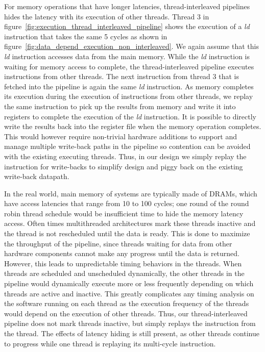 For memory operations that have longer latencies, thread-interleaved pipelines hides the latency with its execution of other threads. 
Thread 3 in figure~\ref{fig:execution_thread_interleaved_pipeline} shows the execution of a \emph{ld} instruction that takes the same 5 cycles as shown in figure~\ref{fig:data_depend_execution_non_interleaved}.
We again assume that this \emph{ld} instruction accesses data from the main memory. 
While the \emph{ld} instruction is waiting for memory access to complete, the thread-interleaved pipeline executes instructions from other threads.
The next instruction from thread 3 that is fetched into the pipeline is again the same \emph{ld} instruction.  
As memory completes its execution during the execution of instructions from other threads, we replay the same instruction to pick up the results from memory and write it into registers to complete the execution of the \emph{ld} instruction. 
It is possible to directly write the results back into the register file when the memory operation completes.
This would however require non-trivial hardware additions to support and manage multiple write-back paths in the pipeline so contention can be avoided with the existing executing threads.
Thus, in our design we simply replay the instruction for write-backs to simplify design and piggy back on the existing write-back datapath.

In the real world, main memory of systems are typically made of DRAMs, which have access latencies that range from 10 to 100 cycles; one round of the round robin thread schedule would be insufficient time to hide the memory latency access.
Often times multithreaded architectures mark these threads inactive and the thread is not rescheduled until the data is ready.
This is done to maximize the throughput of the pipeline, since threads waiting for data from other hardware components cannot make any progress until the data is returned. 
However, this leads to unpredictable timing behaviors in the threads.
When threads are scheduled and unscheduled dynamically, the other threads in the pipeline would dynamically execute more or less frequently depending on which threads are active and inactive.
This greatly complicates any timing analysis on the software running on each thread as the execution frequency of the threads would depend on the execution of other threads.
Thus, our thread-interleaved pipeline does not mark threads inactive, but simply replays the instruction from the thread.
The effects of latency hiding is still present, as other threads continue to progress while one thread is replaying its multi-cycle instruction.  


